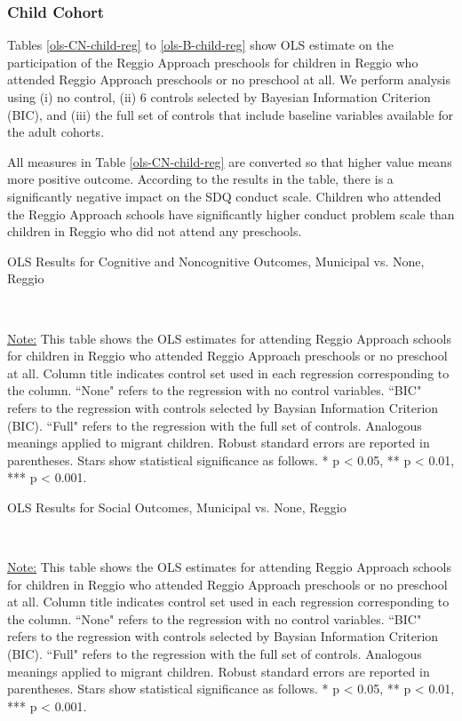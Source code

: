 \subsubsection{Child Cohort}
Tables \ref{ols-CN-child-reg} to \ref{ols-B-child-reg} show OLS estimate on the participation of the Reggio Approach preschools for children in Reggio who attended Reggio Approach preschools or no preschool at all. We perform analysis using (i) no control, (ii) 6 controls selected by Bayesian Information Criterion (BIC), and (iii) the full set of controls that include baseline variables available for the adult cohorts. 

All measures in Table \ref{ols-CN-child-reg} are converted so that higher value means more positive outcome. According to the results in the table, there is a significantly negative impact on the SDQ conduct scale. Children who attended the Reggio Approach schools have significantly higher conduct problem scale than children in Reggio who did not attend any preschools.

\begin{table}[H] \caption{OLS Results for Cognitive and Noncognitive Outcomes, Municipal vs. None, Reggio} \label{ols-CN-child-reg}

\vspace{1ex} \\
\footnotesize\raggedright{\underline{Note:} This table shows the OLS estimates for attending Reggio Approach schools for children in Reggio who attended Reggio Approach preschools or no preschool at all. Column title indicates control set used in each regression corresponding to the column. ``None" refers to the regression with no control variables. ``BIC" refers to the regression with controls selected by Baysian Information Criterion (BIC). ``Full" refers to the regression with the full set of controls. Analogous meanings applied to migrant children. Robust standard errors are reported in parentheses. Stars show statistical significance as follows. * p < 0.05, ** p < 0.01, *** p < 0.001.}
\end{table}

\begin{table}[H] \caption{OLS Results for Social Outcomes, Municipal vs. None, Reggio} \label{ols-S-child-reg}

\vspace{1ex} \\
\footnotesize\raggedright{\underline{Note:} This table shows the OLS estimates for attending Reggio Approach schools for children in Reggio who attended Reggio Approach preschools or no preschool at all. Column title indicates control set used in each regression corresponding to the column. ``None" refers to the regression with no control variables. ``BIC" refers to the regression with controls selected by Baysian Information Criterion (BIC). ``Full" refers to the regression with the full set of controls. Analogous meanings applied to migrant children. Robust standard errors are reported in parentheses. Stars show statistical significance as follows. * p < 0.05, ** p < 0.01, *** p < 0.001.}
\end{table}

